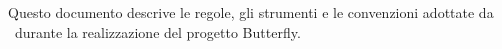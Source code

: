 Questo documento descrive le regole, gli strumenti e le convenzioni adottate da \gruppo\ durante la realizzazione del progetto Butterfly.